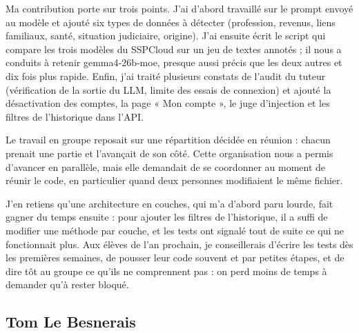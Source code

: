 \documentclass[12pt,a4paper]{article}
\begin{document}
Ma contribution porte sur trois points. J'ai d'abord travaillé sur le prompt envoyé au modèle et ajouté six types de données à détecter (profession, revenus, liens familiaux, santé, situation judiciaire, origine). J'ai ensuite écrit le script qui compare les trois modèles du SSPCloud sur un jeu de textes annotés ; il nous a conduits à retenir gemma4-26b-moe, presque aussi précis que les deux autres et dix fois plus rapide. Enfin, j'ai traité plusieurs constats de l'audit du tuteur (vérification de la sortie du LLM, limite des essais de connexion) et ajouté la désactivation des comptes, la page « Mon compte », le juge d'injection et les filtres de l'historique dans l'API.

Le travail en groupe reposait sur une répartition décidée en réunion : chacun prenait une partie et l'avançait de son côté. Cette organisation nous a permis d'avancer en parallèle, mais elle demandait de se coordonner au moment de réunir le code, en particulier quand deux personnes modifiaient le même fichier.

J'en retiens qu'une architecture en couches, qui m'a d'abord paru lourde, fait gagner du temps ensuite : pour ajouter les filtres de l'historique, il a suffi de modifier une méthode par couche, et les tests ont signalé tout de suite ce qui ne fonctionnait plus. Aux élèves de l'an prochain, je conseillerais d'écrire les tests dès les premières semaines, de pousser leur code souvent et par petites étapes, et de dire tôt au groupe ce qu'ils ne comprennent pas : on perd moins de temps à demander qu'à rester bloqué.

\subsection{Tom Le Besnerais}
\end{document}

